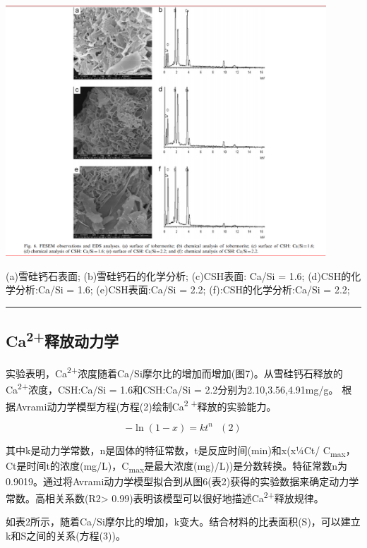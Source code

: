 \documentclass[11pt]{article}
\begin{document}
\includegraphics[width=0.9\textwidth]{fig.6.png}
 \label{tab:title}

(a)雪硅钙石表面;
(b)雪硅钙石的化学分析;
(c)CSH表面: Ca/Si = 1.6;
(d)CSH的化学分析:Ca/Si = 1.6;
(e)CSH表面:Ca/Si = 2.2;
(f):CSH的化学分析:Ca/Si = 2.2;

\noindent\rule{\textwidth}{0.5pt}


\subsection{Ca\textsuperscript{2+}释放动力学}
\label{sec:orge4d909d}
\setlength{\parindent}{1.0cm}
实验表明，Ca\textsuperscript{2+}浓度随着Ca/Si摩尔比的增加而增加(图7)。从雪硅钙石释放的
Ca\textsuperscript{2+}浓度，CSH:Ca/Si = 1.6和CSH:Ca/Si = 2.2分别为2.10,3.56,4.91mg/g。
根据Avrami动力学模型方程(方程(2)绘制Ca\textsuperscript{2 +}释放的实验能力。\cite{demirkıran07_dissol_kinet_ulexit_perch_acid_solut}
\par

\[-\ln(1-x) = kt^{n} \ \ \ (2)\]

\setlength{\parindent}{1.0cm}
其中k是动力学常数，n是固体的特征常数，t是反应时间(min)和x(x¼Ct/ C\textsubscript{max}，Ct是时间t的浓度(mg/L)，C\textsubscript{max}是最大浓度(mg)/L))是分数转换。特征常数n为0.9019。通过将Avrami动力学模型拟合到从图6(表2)获得的实验数据来确定动力学常数。高相关系数(R2> 0.99)表明该模型可以很好地描述Ca\textsuperscript{2+}释放规律。
\par


\setlength{\parindent}{1.0cm}
如表2所示，随着Ca/Si摩尔比的增加，k变大。结合材料的比表面积(S)，可以建立k和S之间的关系(方程(3))。
\par
\end{document}
